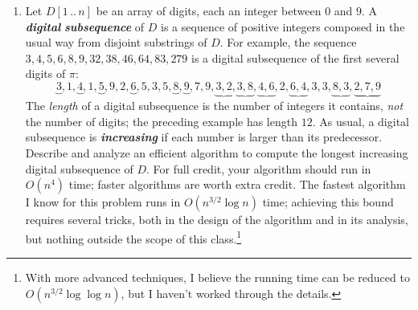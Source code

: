 \begin{enumerate}[label=\arabic*.,ref=\thechapter.\arabic*,leftmargin=*,align=left,widest*=99,itemsep=1.5ex plus 0.5ex]
An \textit{edit center} for $W$ is a string $C\in \Sigma^*$ such that the maximum edit distance
from $C$ to any string in $W$ is as small as possible.
The \textit{edit radius} of $W$ is the maximum edit distance from an edit center to a string in $W$.
A set of strings may have several edit centers, but its edit radius is unique.
\[
\begin{array}{l}
\Var{EditRadius}(W) := \displaystyle\min_{C \in \Sigma^*} \max_{w \in W} \Var{Edit}(w,C)\\[1ex]
\Var{EditCenter}(W) := \displaystyle\arg\min_{C \in \Sigma^*} \max_{w \in W} \Var{Edit}(w,C)
\end{array}
\]
\begin{enumerate}
\item Describe and analyze an efficient algorithm to compute the edit radius of three given strings.
\item {} Describe and analyze an efficient algorithm to approximate the edit radius of an arbitrary set of strings within a factor of $2$.
(Computing the \textit{exact} edit radius is NP-hard unless the number of strings is fixed.)
\end{enumerate}
\item {} Let $D[1\,..\,n]$ be an array of digits, each an integer between $0$ and $9$.
A \textbf{\textit{digital}} \textbf{\textit{subsequence}} of $D$ is a sequence of positive integers composed in the usual way from disjoint substrings of $D$.
For example, the sequence $3,4,5,6,8,9,32,38,46,64,83,279$ is a digital subsequence of the first several digits of $\pi$:
\[
\underbrace{3},1,\underbrace{4},1,\underbrace{5},9,2,\underbrace{6},5,3,5,\underbrace{8},\underbrace{9},7,9,\underbrace{3,2},\underbrace{3,8},\underbrace{4,6},2,\underbrace{6,4},3,3,\underbrace{8,3},\underbrace{2,7,9}
\]
The \textit{length} of a digital subsequence is the number of integers it contains, \textit{not} the number of digits; the preceding example has length $12$.
As usual, a digital subsequence is \textbf{\textit{increasing}} if each number is larger than its predecessor.
Describe and analyze an efficient algorithm to compute the longest increasing digital subsequence of $D$.
For full credit, your algorithm should run in $O(n^4)$ time; faster algorithms are worth extra credit.
The fastest algorithm I know for this problem runs in $O(n^{3/2}\log n)$ time; achieving this bound requires several tricks, both in the design of the algorithm and in its analysis, but nothing outside the scope of this class.\footnote{With more advanced techniques, I believe the running time can be reduced to $O(n^{3/2}\log\log n)$, but I haven’t worked through the details.}

\end{enumerate}
